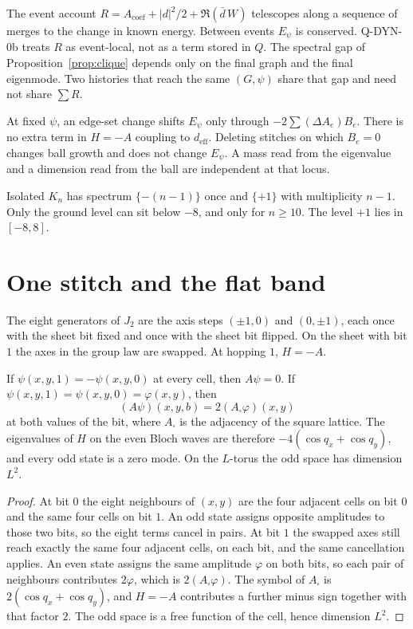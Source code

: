 The event account \(R=A_{\mathrm{coef}}+|d|^2/2+\Re(\bar d\, W)\)
telescopes along a sequence of merges to the change in known energy.
Between events \(E_\psi\) is conserved.
Q-DYN-0b treats \(R\) as event-local, not as a term stored in \(Q\).
The spectral gap of Proposition~\ref{prop:clique} depends only on the
final graph and the final eigenmode.
Two histories that reach the same \((G,\psi)\) share that gap and need not
share \(\sum R\).

At fixed \(\psi\), an edge-set change shifts \(E_\psi\) only through
\(-2\sum(\Delta A_e) B_e\).
There is no extra term in \(H=-A\) coupling to \(d_{\mathrm{eff}}\).
Deleting stitches on which \(B_e=0\) changes ball growth and does not change
\(E_\psi\).
A mass read from the eigenvalue and a dimension read from the ball are
independent at that locus.

Isolated \(K_n\) has spectrum \(\{-(n-1)\}\) once and \(\{+1\}\) with
multiplicity \(n-1\).
Only the ground level can sit below \(-8\), and only for \(n\ge 10\).
The level \(+1\) lies in \([-8,8]\).

\section{One stitch and the flat band}
\label{sec:stitch}

The eight generators of \(J_2\) are the axis steps
\((\pm 1,0)\) and \((0,\pm 1)\), each once with the sheet bit fixed and
once with the sheet bit flipped.
On the sheet with bit \(1\) the axes in the group law are swapped.
At hopping \(1\), \(H=-A\).

\begin{lemma}
\label{lem:sectors}
If \(\psi(x,y,1)=-\psi(x,y,0)\) at every cell, then \(A\psi=0\).
If \(\psi(x,y,1)=\psi(x,y,0)=\varphi(x,y)\), then
\[
(A\psi)(x,y,b)=2(A_\square\varphi)(x,y)
\]
at both values of the bit, where \(A_\square\) is the adjacency of the
square lattice.
The eigenvalues of \(H\) on the even Bloch waves are therefore
\(-4(\cos q_x+\cos q_y)\), and every odd state is a zero mode.
On the \(L\)-torus the odd space has dimension \(L^2\).
\end{lemma}

\begin{proof}
At bit \(0\) the eight neighbours of \((x,y)\) are the four adjacent cells
on bit \(0\) and the same four cells on bit \(1\).
An odd state assigns opposite amplitudes to those two bits, so the eight
terms cancel in pairs.
At bit \(1\) the swapped axes still reach exactly the same four adjacent
cells, on each bit, and the same cancellation applies.
An even state assigns the same amplitude \(\varphi\) on both bits, so each
pair of neighbours contributes \(2\varphi\), which is \(2(A_\square\varphi)\).
The symbol of \(A_\square\) is \(2(\cos q_x+\cos q_y)\), and \(H=-A\)
contributes a further minus sign together with that factor \(2\).
The odd space is a free function of the cell, hence dimension \(L^2\).
\end{proof}


